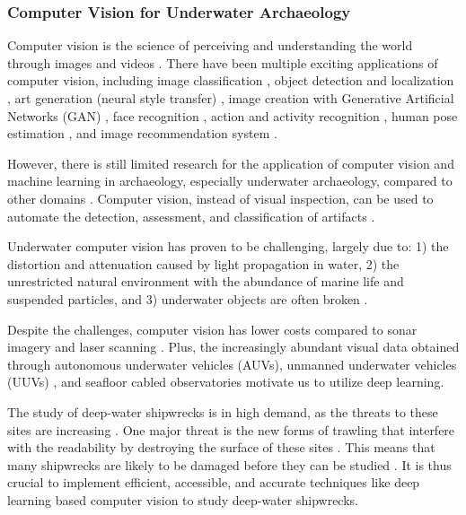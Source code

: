 \documentclass[a4paper, 11pt, oneside]{article}
\begin{document}
\subsubsection{Computer Vision for Underwater Archaeology}

\label{sec:cvForUnderwater}

Computer vision is the science of perceiving and understanding the world through images and videos \cite{elgendy2020deep}.
There have been multiple exciting applications of computer vision, including image classification \cite{rawat2017deep},
object detection and localization \cite{zhao2019object,liu2020deep}, art generation (neural style transfer)
\cite{jing2019neural}, image creation with Generative Artificial Networks (GAN) \cite{goodfellow2014generative},
face recognition \cite{parkhi2015deep}, action and activity recognition \cite{poppe2010survey}, human pose estimation
\cite{toshev2014deeppose}, and image recommendation system \cite{niu2018neural}.

However, there is still limited research for the application of computer vision and machine learning in archaeology,
especially underwater archaeology, compared to other domains \cite{maaten2007computer, qin2015underwater}.
Computer vision, instead of visual inspection, can be used to automate the detection, assessment, and classification
of artifacts \cite{maaten2007computer}.

Underwater computer vision has proven to be challenging, largely due to: 1) the distortion and attenuation caused by
light propagation in water, 2) the unrestricted natural environment with the abundance of marine life and suspended
particles, and 3) underwater objects are often broken
\cite{qin2015underwater, rizzini2015investigation, lu2017underwater, mccarthy20193d}.

Despite the challenges, computer vision has lower costs \cite{rizzini2015investigation} compared to sonar imagery
\cite{abu2019statistically} and laser scanning \cite{gordon1992use}. Plus, the increasingly abundant visual data obtained
through autonomous underwater vehicles (AUVs), unmanned underwater vehicles (UUVs)
\cite{lu2017underwater, moniruzzaman2017deep}, and seafloor cabled observatories \cite{qin2015underwater} motivate us
to utilize deep learning.

The study of deep-water shipwrecks is in high demand, as the threats to these sites are increasing
\cite{drap2015underwater}. One major threat is the new forms of trawling that interfere with the readability by
destroying the surface of these sites \cite{drap2015underwater}. This means that many shipwrecks are likely to be damaged
before they can be studied \cite{drap2015underwater}. It is thus crucial to implement efficient, accessible, and accurate
techniques like deep learning based computer vision to study deep-water shipwrecks.
\end{document}
